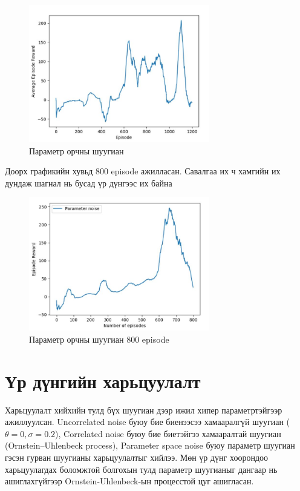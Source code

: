 \documentclass[12pt,A4]{report}
\begin{document}
\begin{figure}[H]
\centering
\includegraphics[width=0.7\textwidth]{./images/PSN_a-lr-0-0001_c-lr-0-001_1200ep}
\caption{Параметр орчны шуугиан}
\end{figure}

Доорх графикийн хувьд 800 episode ажилласан. Савалгаа их ч хамгийн их дундаж шагнал нь бусад үр дүнгээс их байна

\begin{figure}[H]
\centering
\includegraphics[width=0.7\textwidth]{./images/Parameter_0-0001_0-001-800ep}
\caption{Параметр орчны шуугиан 800 episode}
\end{figure}


\section{Үр дүнгийн харьцуулалт}

Харьцуулалт хийхийн тулд бүх шуугиан дээр ижил хипер параметртэйгээр ажиллуулсан.  Uncorrelated noise буюу бие биенээсээ хамааралгүй шуугиан ($\theta=0, \sigma=0.2$), Correlated noise буюу бие биетэйгээ хамааралтай шуугиан (Ornstein–Uhlenbeck process), Parameter space noise буюу параметр шуугиан гэсэн гурван шуугианы харьцуулалтыг хийлээ. Мөн үр дүнг хоорондоо харьцуулагдах боломжтой болгохын тулд параметр шуугианыг дангаар нь ашиглахгүйгээр Ornstein-Uhlenbeck-ын процесстой цуг ашигласан.
\end{document}
